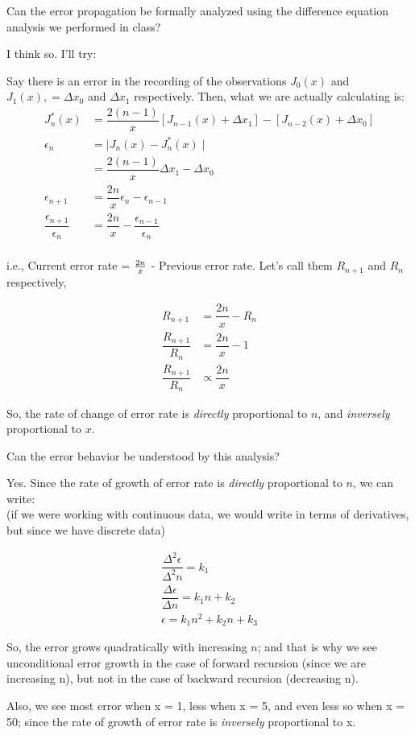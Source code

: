 \documentclass[12pt,letterpaper]{article}
\begin{document}
Can the error propagation be formally analyzed using the difference equation analysis we performed in class? \par
I think so. I'll try: \par
Say there is an error in the recording of the observations $J_0(x)$ and $J_1(x), = \Delta x_0$ and $\Delta x_1$ respectively.
Then, what we are actually calculating is: \\
\begin{align*}
J_n^*(x) &= \dfrac{2(n-1)}{x} [J_{n-1}(x) + \Delta x_1] - [J_{n-2}(x) + \Delta x_0] \\
\epsilon_n & = \mid J_n(x) - J_n^*(x) \mid \\
&= \dfrac{2(n-1)}{x} \Delta x_1 - \Delta x_0 \\
\epsilon_{n+1} &= \dfrac{2n}{x} \epsilon_n - \epsilon_{n-1} \\
\dfrac{\epsilon_{n+1}}{\epsilon_n} &= \dfrac{2n}{x} - \dfrac{\epsilon_{n-1}}{\epsilon_n}\\
\end{align*}

i.e., Current error rate = $2n\over x$ - Previous error rate. Let's call them $R_{n+1}$ and $R_n$ respectively,

\begin{align*}
R_{n+1} &= \dfrac{2n}{x} - R_n \\
\dfrac{R_{n+1}}{R_n} &= \dfrac{2n}{x} - 1 \\
\dfrac{R_{n+1}}{R_n} &\propto \dfrac{2n}{x}
\end{align*}

So, the rate of change of error rate is \emph{directly} proportional to $n$, and \emph{inversely} proportional to $x$.

\newpage

Can the error behavior be understood by this analysis? \par
Yes. Since the rate of growth of error rate is \emph{directly} proportional to $n$, we can write: \\
(if we were working with continuous data, we would write in terms of derivatives, but since we have discrete data)

\begin{align*}
\dfrac{\Delta^2 \epsilon}{\Delta^2 n} = k_1 \\
\dfrac{\Delta \epsilon}{\Delta n} = k_1n + k_2 \\
\epsilon = k_1 n^2 + k_2 n + k_3
\end{align*}

So, the error grows quadratically with increasing $n$; and that is why we see unconditional error growth in the case of forward recursion (since we are increasing n), but not in the case of backward recursion (decreasing n). \par
Also, we see most error when x = 1, less when x = 5, and even less so when x = 50; since the rate of growth of error rate is \emph{inversely} proportional to x.
\end{document}
